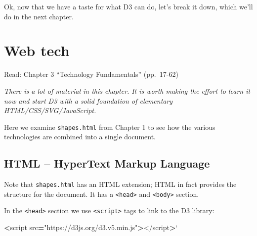 \documentclass[]{book}
\newenvironment{Shaded}{\begin{snugshade}}{\end{snugshade}}
\newcommand{\AttributeTok}[1]{\textcolor[rgb]{0.77,0.63,0.00}{#1}}
\newcommand{\KeywordTok}[1]{\textcolor[rgb]{0.13,0.29,0.53}{\textbf{#1}}}
\newcommand{\NormalTok}[1]{#1}
\newcommand{\OperatorTok}[1]{\textcolor[rgb]{0.81,0.36,0.00}{\textbf{#1}}}
\newcommand{\SpecialCharTok}[1]{\textcolor[rgb]{0.00,0.00,0.00}{#1}}
\newcommand{\StringTok}[1]{\textcolor[rgb]{0.31,0.60,0.02}{#1}}
\newcommand{\VariableTok}[1]{\textcolor[rgb]{0.00,0.00,0.00}{#1}}
\newcommand{\VerbatimStringTok}[1]{\textcolor[rgb]{0.31,0.60,0.02}{#1}}
\begin{document}
\begin{enumerate}
\begin{Shaded}
\end{Shaded}
\end{enumerate}

Ok, now that we have a taste for what D3 can do, let's break it down, which we'll do in the next chapter.

\hypertarget{web-tech}{%
\chapter{Web tech}\label{web-tech}}

Read: Chapter 3 ``Technology Fundamentals'' (pp.~17-62)

\emph{There is a lot of material in this chapter. It is worth making the effort to learn it now and start D3 with a solid foundation of elementary HTML/CSS/SVG/JavaScript.}

Here we examine \texttt{shapes.html} from Chapter 1 to see how the various technologies are combined into a single document.

\hypertarget{html-hypertext-markup-language}{%
\section{HTML -- HyperText Markup Language}\label{html-hypertext-markup-language}}

Note that \texttt{shapes.html} has an HTML extension; HTML in fact provides the structure for the document. It has a \texttt{\textless{}head\textgreater{}} and \texttt{\textless{}body\textgreater{}} section.

In the \texttt{\textless{}head\textgreater{}} section we use \texttt{\textless{}script\textgreater{}} tags to link to the D3 library:

\begin{Shaded}
\begin{Highlighting}[]
\OperatorTok{<}\NormalTok{script src}\OperatorTok{=}\StringTok{"https://d3js.org/d3.v5.min.js"}\OperatorTok{>}\NormalTok{</script}\OperatorTok{>}\VerbatimStringTok{`}
\end{Highlighting}
\end{Shaded}
\end{document}
